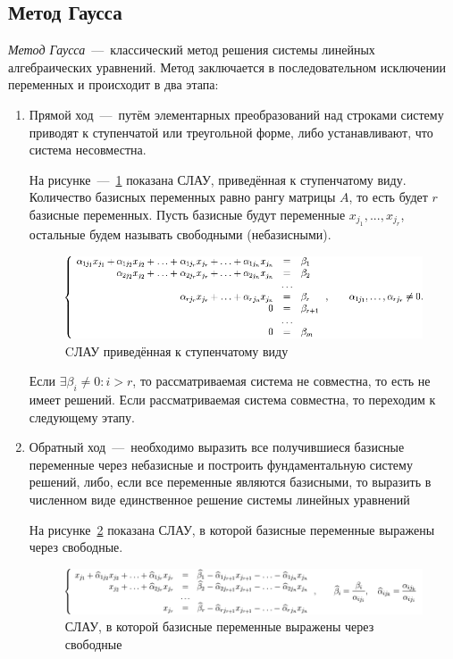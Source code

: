 \documentclass[12pt,a4paper,oneside]{extarticle}
\begin{document}
    \subsection{Метод Гаусса}
        {\it Метод Гаусса}~---~классический метод решения системы линейных алгебраических уравнений. Метод заключается в последовательном исключении переменных и происходит в два этапа:
        \begin{enumerate}
            \item Прямой ход~---~путём элементарных преобразований над строками систему приводят к ступенчатой или треугольной форме, либо устанавливают, что система несовместна.

                На рисунке~---~\ref{pic:gaussian1} показана СЛАУ, приведённая к ступенчатому виду. Количество базисных переменных равно рангу матрицы $A$, то есть будет $r$ базисные переменных. Пусть базисные будут переменные $x_{j_1}, ..., x_{j_r}$, остальные будем называть свободными (небазисными). 
                \begin{figure}[h!]
                    \centering
                    \includegraphics[scale=0.65]{gaussian1.png}
                    \caption{CЛАУ приведённая к ступенчатому виду}
                    \label{pic:gaussian1}
                \end{figure}

                Если $\exists \beta_i \neq 0 \colon i>r$, то рассматриваемая система не совместна, то есть не имеет решений. Если рассматриваемая система совместна, то переходим к следующему этапу.

            \item Обратный ход~---~необходимо выразить все получившиеся базисные переменные через небазисные и построить фундаментальную систему решений, либо, если все переменные являются базисными, то выразить в численном виде единственное решение системы линейных уравнений

                На рисунке~\ref{pic:gaussian2} показана СЛАУ, в которой базисные переменные выражены через свободные.
                \begin{figure}[h!]
                    \centering
                    \includegraphics[scale=0.45]{gaussian2.png}
                    \caption{СЛАУ, в которой базисные переменные выражены через свободные}
                    \label{pic:gaussian2}
                \end{figure}


\end{enumerate}
\end{document}
